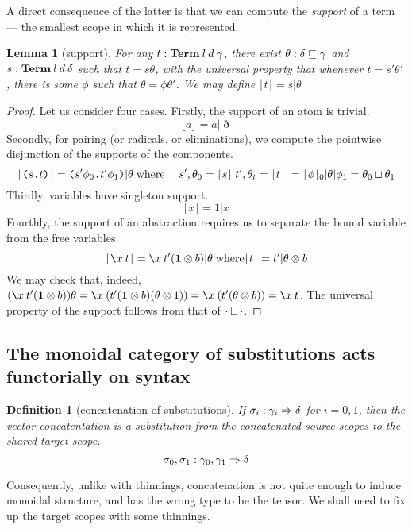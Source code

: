 \documentclass{jfp1}
\newtheorem{lemma}[theorem]{Lemma}
\newtheorem{definition}[theorem]{Definition}
\newcommand{\Pa}[1]{\texttt{(}#1\texttt{)}}
\newcommand{\dt}{\texttt{.}}
\newcommand{\cn}[2]{\Pa{#1 \dt #2}}
\begin{document}
A direct consequence of the latter is that we can compute the
\emph{support} of a term --- the smallest scope in which it is
represented.
\newcommand{\supp}[1]{\lfloor #1 \rfloor}
\begin{lemma}[support]
  For any $t:\mathbf{Term}\:l\:d\:\gamma$, there exist $\theta:\delta\sqsubseteq\gamma$ and
  $s:\mathbf{Term}\:l\:d\:\delta$ such that $t = s\theta$, with the universal
  property that whenever $t=s'\theta'$, there is some $\phi$ such that
  $\theta=\phi\theta'$. We may define $\supp t = s|\theta$
\end{lemma}
\begin{proof}
  Let us consider four cases. Firstly, the support of an atom is
  trivial.
  \[
    \supp a = a|\eth
  \]
  Secondly, for pairing (or radicals, or
  eliminations), we compute the pointwise disjunction of the supports of the components.
  \[
    \supp{\cn st} = \cn{s'\phi_0}{t'\phi_1}|\theta\;\mbox{where}\quad
    \;s',\theta_0=\supp s\; t',\theta_t=\supp t\;
    =\supp\phi_0|\theta|\phi_1 = \cp{\theta_0}{\theta_1} \\
  \]
  Thirdly, variables have singleton support.
  \[
    \supp x = 1|x
  \]
  Fourthly, the support of an abstraction requires us to separate the
  bound variable from the free variables.
  \[
    \supp{\la xt} = \la xt'(\ith\otimes b)|\theta\;\mbox{where}\supp
    t=t'|\theta\otimes b
  \]
  We may check that, indeed,
  $(\la xt'(\ith\otimes b))\theta
  = \la x(t'(\ith\otimes b)(\theta\otimes 1))
  = \la x(t'(\theta\otimes b)) = \la xt$.
  The universal property of the support follows from that of $\cdot \sqcup \cdot$.
\end{proof}


\subsection{The monoidal category of substitutions acts functorially on syntax\label{sec:sbstcat}}


\begin{definition}[concatenation of substitutions]
  If $\sigma_i:\gamma_i\Rightarrow\delta$ for $i=0,1$, then the vector
  concatentation is a substitution from the concatenated source scopes
  to the shared target scope.
  \[\sigma_0,\sigma_1 : \gamma_0,\gamma_1\Rightarrow\delta
    \]
\end{definition}

Consequently, unlike with thinnings, concatenation is not quite enough
to induce monoidal structure, and has the wrong type to be the tensor.
We shall need to fix up the target scopes with some thinnings.
\end{document}
